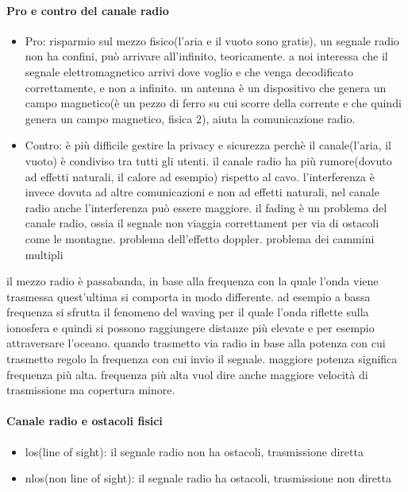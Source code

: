 \paragraph{Pro e contro del canale radio}
\begin{itemize}    
    \item Pro: risparmio sul mezzo fisico(l’aria e il vuoto sono gratis), un segnale radio non ha confini, può arrivare all’infinito, teoricamente. a noi interessa che il segnale elettromagnetico arrivi dove voglio e che venga decodificato correttamente, e non a infinito. 
un antenna è un dispositivo che genera un campo magnetico(è un pezzo di ferro su cui scorre della corrente e che quindi genera un campo magnetico, fisica 2), aiuta la comunicazione radio. 
    \item Contro: è più difficile gestire la privacy e sicurezza perchè il canale(l’aria, il vuoto) è condiviso tra tutti gli utenti. il canale radio ha più rumore(dovuto ad effetti naturali, il calore ad esempio) rispetto al cavo. l’interferenza è invece dovuta ad altre comunicazioni e non ad effetti naturali, nel canale radio anche l’interferenza può essere maggiore. il fading è un problema del canale radio, ossia il segnale non viaggia correttament per via di ostacoli come le montagne. problema dell’effetto doppler. problema dei cammini multipli
\end{itemize}
il mezzo radio è passabanda, in base alla frequenza con la quale l'onda viene trasmessa quest'ultima si comporta in modo differente. ad esempio a bassa frequenza si sfrutta il fenomeno del waving per il quale l'onda riflette sulla ionosfera e quindi si possono raggiungere distanze più elevate e per esempio attraversare l'oceano.
quando trasmetto via radio in base alla potenza con cui trasmetto regolo la frequenza con cui invio il segnale. maggiore potenza significa frequenza più alta. frequenza più alta vuol dire anche maggiore velocità di trasmissione ma copertura minore.
\paragraph{Canale radio e ostacoli fisici}
\begin{itemize}
    \item los(line of sight): il segnale radio non ha ostacoli, trasmissione diretta
    \item nlos(non line of sight): il segnale radio ha ostacoli, trasmissione non diretta
\end{itemize}
